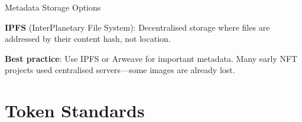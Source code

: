 \documentclass[10pt]{beamer}
\begin{document}
\begin{frame}{Metadata Storage Options}
  
  \begin{center}
  \end{center}
  
  \vspace{1em}
  \textbf{IPFS} (InterPlanetary File System): Decentralised storage where files are addressed by their content hash, not location.
  
  \vspace{0.5em}
  \textbf{Best practice}: Use IPFS or Arweave for important metadata. Many early NFT projects used centralised servers---some images are already lost.
\end{frame}

\section{Token Standards}
\end{document}
